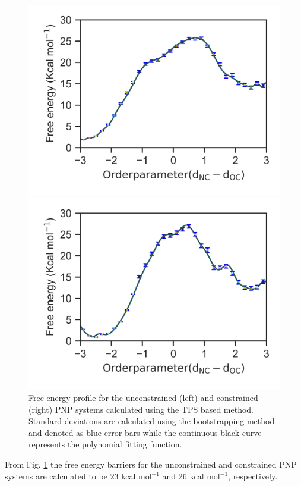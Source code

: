 \documentclass[notitlepage,preprint,%
amssymb,amsmath,
 aip,jcp%
]{revtex4-1}
\begin{document}
\begin{figure}[ht!]
  \centering
  \begin{minipage}[b]{0.48\linewidth}
    \includegraphics[scale=1.0]{figures/pnp-uncons-fenergy.png}
  \end{minipage}
  \quad
  \begin{minipage}[b]{0.48\linewidth}
    \includegraphics[scale=1.0]{figures/pnp-cons-fenergy.png}
  \end{minipage}
  \caption{Free energy profile for the unconstrained (left) and constrained (right) PNP systems 
  calculated using the TPS based method. Standard deviations are calculated using the bootstrapping 
method and denoted as blue error bars while the continuous black curve represents the polynomial 
fitting function.}
\label{fig:fenergy}
\end{figure}

From Fig. \ref{fig:fenergy} the free energy barriers for the unconstrained and constrained PNP systems 
are calculated to be $23$ kcal mol$^{-1}$ and 26 kcal mol$^{-1}$, respectively. 

%

\end{document}
